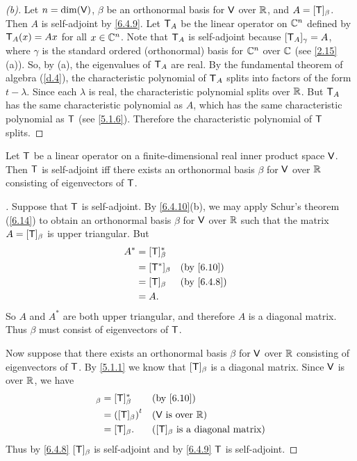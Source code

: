\begin{proof}[(b)]
  Let \(n = \dim(\mathsf{V})\), \(\beta\) be an orthonormal basis for \(\mathsf{V}\) over \(\mathbb{R}\), and \(A = [\mathsf{T}]_{\beta}\).
  Then \(A\) is self-adjoint by \cref{6.4.9}.
  Let \(\mathsf{T}_A\) be the linear operator on \(\mathbb{C}^n\) defined by \(\mathsf{T}_A(x) = Ax\) for all \(x \in \mathbb{C}^n\).
  Note that \(\mathsf{T}_A\) is self-adjoint because \([\mathsf{T}_A]_{\gamma} = A\), where \(\gamma\) is the standard ordered (orthonormal) basis for \(\mathbb{C}^n\) over \(\mathbb{C}\) (see \cref{2.15}(a)).
  So, by (a), the eigenvalues of \(\mathsf{T}_A\) are real.
  By the fundamental theorem of algebra (\cref{d.4}), the characteristic polynomial of \(\mathsf{T}_A\) splits into factors of the form \(t - \lambda\).
  Since each \(\lambda\) is real, the characteristic polynomial splits over \(\mathbb{R}\).
  But \(\mathsf{T}_A\) has the same characteristic polynomial as \(A\), which has the same characteristic polynomial as \(\mathsf{T}\) (see \cref{5.1.6}).
  Therefore the characteristic polynomial of \(\mathsf{T}\) splits.
\end{proof}

\begin{thm}\label{6.17}
  Let \(\mathsf{T}\) be a linear operator on a finite-dimensional real inner product space \(\mathsf{V}\).
  Then \(\mathsf{T}\) is self-adjoint iff there exists an orthonormal basis \(\beta\) for \(\mathsf{V}\) over \(\mathbb{R}\) consisting of eigenvectors of \(\mathsf{T}\).
\end{thm}

\begin{proof}[]
  Suppose that \(\mathsf{T}\) is self-adjoint.
  By \cref{6.4.10}(b), we may apply Schur's theorem (\cref{6.14}) to obtain an orthonormal basis \(\beta\) for \(\mathsf{V}\) over \(\mathbb{R}\) such that the matrix \(A = [\mathsf{T}]_{\beta}\) is upper triangular.
  But
  \begin{align*}
    A^* & = [\T]_{\beta}^*                 \\
        & = [\T^*]_{\beta} &  & \by{6.10}  \\
        & = [\T]_{\beta}   &  & \by{6.4.8} \\
        & = A.
  \end{align*}
  So \(A\) and \(A^*\) are both upper triangular, and therefore \(A\) is a diagonal matrix.
  Thus \(\beta\) must consist of eigenvectors of \(\mathsf{T}\).

  Now suppose that there exists an orthonormal basis \(\beta\) for \(\mathsf{V}\) over \(\mathbb{R}\) consisting of eigenvectors of \(\mathsf{T}\).
  By \cref{5.1.1} we know that \([\mathsf{T}]_{\beta}\) is a diagonal matrix.
  Since \(\mathsf{V}\) is over \(\mathbb{R}\), we have
  \begin{align*}
    [\T^*]_{\beta} & = [\T]_{\beta}^*      &  & \by{6.10}                                      \\
                   & = \tp{([\T]_{\beta})} &  & \text{(\(\V\) is over \(\R\))}                 \\
                   & = [\T]_{\beta}.       &  & \text{(\([\T]_{\beta}\) is a diagonal matrix)}
  \end{align*}
  Thus by \cref{6.4.8} \([\mathsf{T}]_{\beta}\) is self-adjoint and by \cref{6.4.9} \(\mathsf{T}\) is self-adjoint.
\end{proof}

